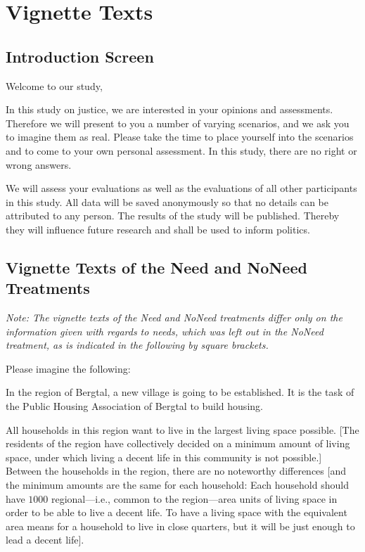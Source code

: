 \documentclass[12pt]{scrartcl}
\begin{document}
\clearpage
\section{Vignette Texts}\label{sec:app_vignette}


\subsection*{Introduction Screen}
\noindent Welcome to our study,

\noindent In this study on justice, we are interested in your opinions and assessments.
Therefore we will present to you a number of varying scenarios, and we ask you to imagine them as real.
Please take the time to place yourself into the scenarios and to come to your own personal assessment.
In this study, there are no right or wrong answers.

We will assess your evaluations as well as the evaluations of all other participants in this study.
All data will be saved anonymously so that no details can be attributed to any person.
The results of the study will be published.
Thereby they will influence future research and shall be used to inform politics.


\subsection*{Vignette Texts of the Need and NoNeed Treatments}
\textit{Note: The vignette texts of the Need and NoNeed treatments differ only on the information given with regards to needs, which was left out in the NoNeed treatment, as is indicated in the following by square brackets.}

\medskip{}
\noindent Please imagine the following:

\noindent In the region of Bergtal, a new village is going to be established.
It is the task of the Public Housing Association of Bergtal to build housing.

All households in this region want to live in the largest living space possible.
{[}The residents of the region have collectively decided on a minimum amount of living space, under which living a decent life in this community is not possible.{]}
Between the households in the region, there are no noteworthy differences {[}and the minimum amounts are the same for each household: Each household should have $1000$ regional---i.e., common to the region---area units of living space in order to be able to live a decent life.
To have a living space with the equivalent area means for a household to live in close quarters, but it will be just enough to lead a decent life{]}.
\end{document}
